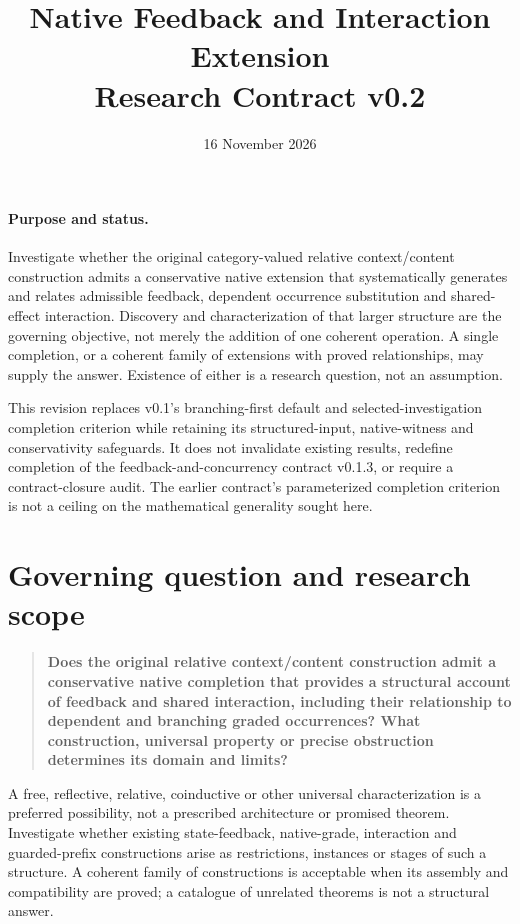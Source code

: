 \documentclass[11pt]{article}
\title{Native Feedback and Interaction Extension\\Research Contract v0.2}
\author{}\date{16 November 2026}
\begin{document}
\maketitle

\paragraph{Purpose and status.}
Investigate whether the original category-valued relative context/content construction admits a conservative native extension that systematically generates and relates admissible feedback, dependent occurrence substitution and shared-effect interaction. Discovery and characterization of that larger structure are the governing objective, not merely the addition of one coherent operation. A single completion, or a coherent family of extensions with proved relationships, may supply the answer. Existence of either is a research question, not an assumption.

This revision replaces v0.1's branching-first default and selected-investigation completion criterion while retaining its structured-input, native-witness and conservativity safeguards. It does not invalidate existing results, redefine completion of the feedback-and-concurrency contract v0.1.3, or require a contract-closure audit. The earlier contract's parameterized completion criterion is not a ceiling on the mathematical generality sought here.

\section{Governing question and research scope}
\begin{quote}
\textbf{Does the original relative context/content construction admit a conservative native completion that provides a structural account of feedback and shared interaction, including their relationship to dependent and branching graded occurrences? What construction, universal property or precise obstruction determines its domain and limits?}
\end{quote}

A free, reflective, relative, coinductive or other universal characterization is a preferred possibility, not a prescribed architecture or promised theorem. Investigate whether existing state-feedback, native-grade, interaction and guarded-prefix constructions arise as restrictions, instances or stages of such a structure. A coherent family of constructions is acceptable when its assembly and compatibility are proved; a catalogue of unrelated theorems is not a structural answer.
\end{document}
